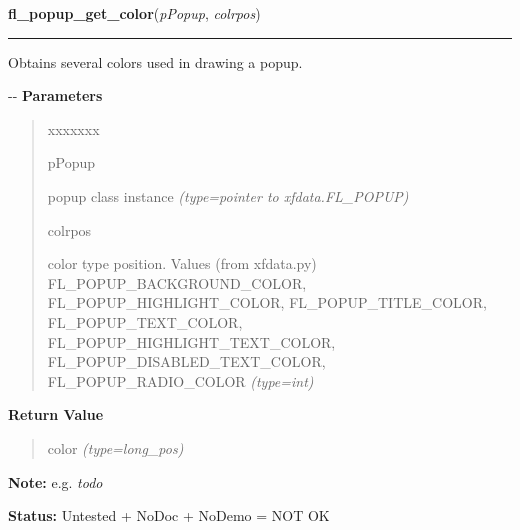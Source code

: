 \hspace{.8\funcindent}\begin{boxedminipage}{\funcwidth}

    \raggedright \textbf{fl\_popup\_get\_color}(\textit{pPopup}, \textit{colrpos})

    \vspace{-1.5ex}

    \rule{\textwidth}{0.5\fboxrule}
\setlength{\parskip}{2ex}

Obtains several colors used in drawing a popup.

-{}-
\setlength{\parskip}{1ex}
      \textbf{Parameters}
      \vspace{-1ex}

      \begin{quote}
        \begin{Ventry}{xxxxxxx}

          \item[pPopup]


popup class instance
            {\it (type=pointer to xfdata.FL\_POPUP)}

          \item[colrpos]


color type position. Values (from xfdata.py) FL\_POPUP\_BACKGROUND\_COLOR,
FL\_POPUP\_HIGHLIGHT\_COLOR, FL\_POPUP\_TITLE\_COLOR, FL\_POPUP\_TEXT\_COLOR,
FL\_POPUP\_HIGHLIGHT\_TEXT\_COLOR, FL\_POPUP\_DISABLED\_TEXT\_COLOR,
FL\_POPUP\_RADIO\_COLOR
            {\it (type=int)}

        \end{Ventry}

      \end{quote}

      \textbf{Return Value}
    \vspace{-1ex}

      \begin{quote}

color
      {\it (type=long\_pos)}

      \end{quote}

\textbf{Note:} 
e.g. \emph{todo}


\textbf{Status:} 
Untested + NoDoc + NoDemo = NOT OK


    \end{boxedminipage}

    \label{xformslib:flpopup:fl_popup_set_color}

